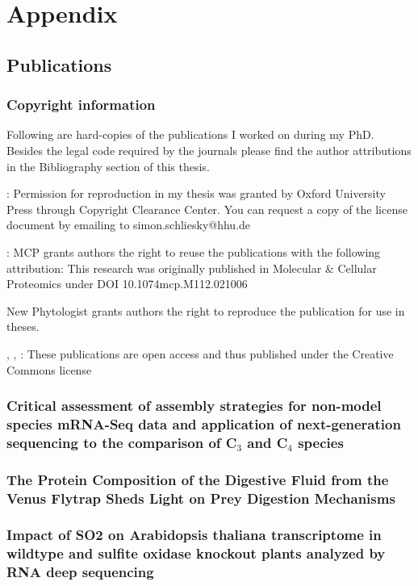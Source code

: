 \chapter{Appendix}
\section{Publications}
\subsection{Copyright information}
Following are hard-copies of the publications I worked on during my PhD.
Besides the legal code required by the journals please find the author attributions in the Bibliography section of this thesis.


\cite{mp_Braeutigam2011}:
Permission for reproduction in my thesis was granted by Oxford University Press through Copyright Clearance Center. You can request a copy of the license document by emailing to simon.schliesky@hhu.de


\cite{mp_Schulze2012}:
MCP grants authors the right to reuse the publications with the following attribution:
This research was originally published in Molecular \& Cellular Proteomics under DOI 10.1074\/mcp.M112.021006


\cite{mp_Hamisch2012}
New Phytologist grants authors the right to reproduce the publication for use in theses.


\cite{mp_Schliesky2012},
\cite{mp_Bhide2014},
\cite{mp_Braeutigam2014}:
These publications are open access and thus published under the Creative Commons license

\clearpage
\subsection{Critical assessment of assembly strategies for non-model species mRNA-Seq data and application of next-generation sequencing to the comparison of C$_3$ and C$_4$ species}


\subsection{The Protein Composition of the Digestive Fluid
from the Venus Flytrap Sheds Light on Prey
Digestion Mechanisms}


\subsection{Impact of SO2 on Arabidopsis thaliana transcriptome in wildtype and sulfite oxidase knockout plants analyzed by RNA deep sequencing}


